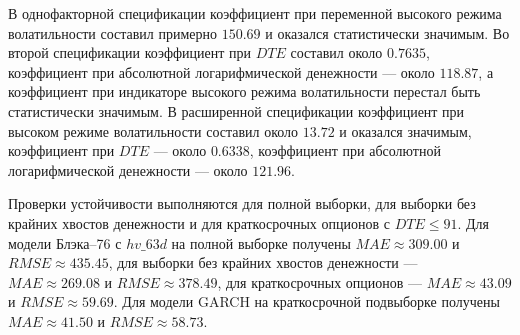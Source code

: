 \documentclass[11pt,a4paper]{article}
\begin{document}
В однофакторной спецификации коэффициент при переменной высокого режима волатильности составил примерно $150.69$ и оказался статистически значимым. Во второй спецификации коэффициент при $DTE$ составил около $0.7635$, коэффициент при абсолютной логарифмической денежности --- около $118.87$, а коэффициент при индикаторе высокого режима волатильности перестал быть статистически значимым. В расширенной спецификации коэффициент при высоком режиме волатильности составил около $13.72$ и оказался значимым, коэффициент при $DTE$ --- около $0.6338$, коэффициент при абсолютной логарифмической денежности --- около $121.96$.

Проверки устойчивости выполняются для полной выборки, для выборки без крайних хвостов денежности и для краткосрочных опционов с $DTE \leq 91$. Для модели Блэка--76 с $hv\_63d$ на полной выборке получены $MAE \approx 309.00$ и $RMSE \approx 435.45$, для выборки без крайних хвостов денежности --- $MAE \approx 269.08$ и $RMSE \approx 378.49$, для краткосрочных опционов --- $MAE \approx 43.09$ и $RMSE \approx 59.69$. Для модели GARCH на краткосрочной подвыборке получены $MAE \approx 41.50$ и $RMSE \approx 58.73$.
\end{document}
